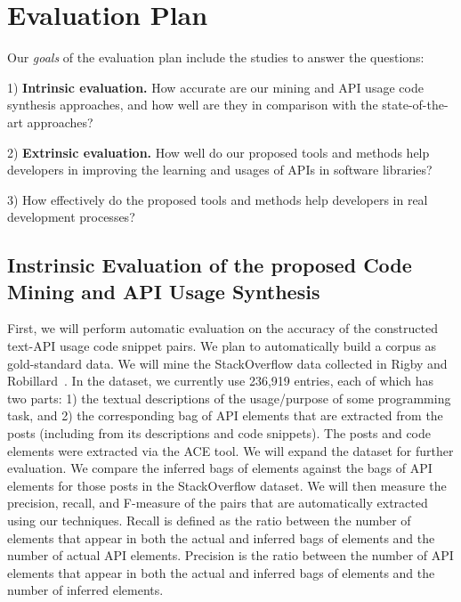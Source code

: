 \section{Evaluation Plan}
\label{eval-section}

Our {\em goals} of the evaluation plan include the studies to answer the questions:

1) {\bf Intrinsic evaluation.} How accurate are our mining and API
usage code synthesis approaches, and how well are they in comparison
with the state-of-the-art approaches?

2) {\bf Extrinsic evaluation.} How well do our proposed tools and methods help developers in
improving the learning and usages of APIs in software libraries?

3) How effectively do the proposed tools and methods help developers
in real development processes?



\subsection{Instrinsic Evaluation of the proposed Code Mining and API Usage Synthesis}

First, we will perform automatic evaluation on the accuracy of the
constructed text-API usage code snippet pairs. We plan to
automatically build a corpus as gold-standard data. We will mine the
StackOverflow data collected in Rigby and
Robillard~\cite{rigby-icse13}. In the dataset, we currently use
236,919 entries, each of which has two parts: 1) the textual
descriptions of the usage/purpose of some programming task, and 2) the
corresponding bag of API elements that are extracted from the posts
(including from its descriptions and code snippets). The posts and
code elements were extracted via the ACE tool. We will expand the
dataset for further evaluation. We compare the inferred bags of
elements against the bags of API elements for those posts in the
StackOverflow dataset. We will then measure the precision, recall, and
F-measure of the pairs that are automatically extracted using our
techniques.  Recall is defined as the ratio between the number of
elements that appear in both the actual and inferred bags of elements
and the number of actual API elements. Precision is the ratio between
the number of API elements that appear in both the actual and inferred
bags of elements and the number of inferred elements.


